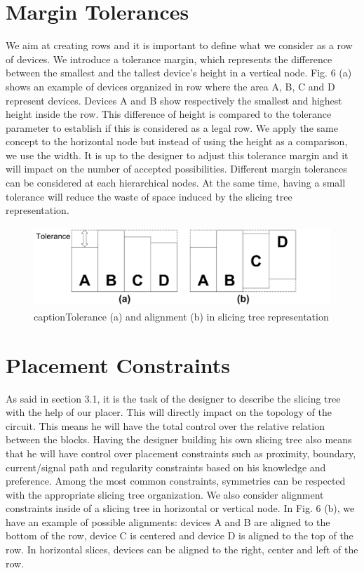\section{Margin Tolerances}
We aim at creating rows and it is important to define what we consider as a row of devices. We introduce a tolerance margin, which represents the difference between the smallest and the tallest device's height in a vertical node. Fig. 6 (a) shows an example of devices organized in row where the area A, B, C and D represent devices. Devices A and B show respectively the smallest and highest height inside the row. This difference of height is compared to the tolerance parameter to establish if this is considered as a legal row. We apply the same concept to the horizontal node but instead of using the height as a comparison, we use the width. It is up to the designer to adjust this tolerance margin and it will impact on the number of accepted possibilities. Different margin tolerances can be considered at each hierarchical nodes. At the same time, having a small tolerance will reduce the waste of space induced by the slicing tree representation.

\begin{figure}[h]
\begin{center}
\includegraphics[height=30mm]{Figures/2.png}
caption{Tolerance (a) and alignment (b) in slicing tree representation}
\end{center}
\end{figure}
\vspace{-1cm}
\section{Placement Constraints}
As said in section 3.1, it is the task of the designer to describe the slicing tree with the help of our placer. This will directly impact on the topology of the circuit. This means he will have the total control over the relative relation between the blocks. Having the designer building his own slicing tree also means that he will have control over placement constraints such as proximity, boundary, current/signal path and regularity constraints based on his knowledge and preference.
\newline 
\newline 
\indent Among the most common constraints, symmetries can be respected with the appropriate slicing tree organization. We also consider alignment constraints inside of a slicing tree in horizontal or vertical node. In Fig. 6 (b), we have an example of possible alignments: devices A and B are aligned to the bottom of the row, device C is centered and device D is aligned to the top of the row. In horizontal slices, devices can be aligned to the right, center and left of the row.

